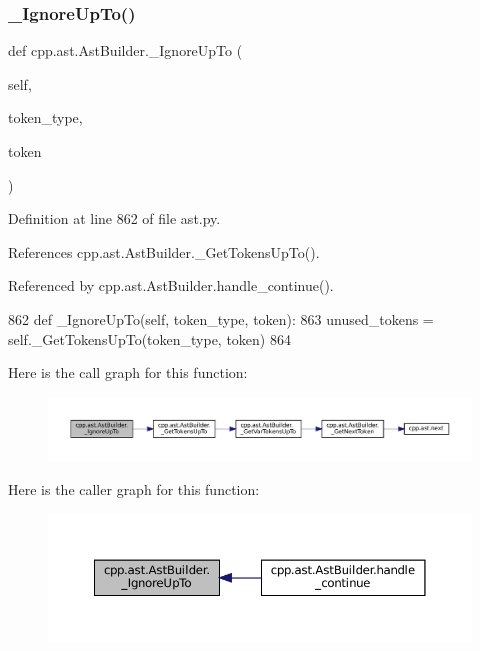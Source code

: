 \subsubsection{\texorpdfstring{\+\_\+\+Ignore\+Up\+To()}{\_IgnoreUpTo()}}
{\footnotesize\ttfamily def cpp.\+ast.\+Ast\+Builder.\+\_\+\+Ignore\+Up\+To (\begin{DoxyParamCaption}\item[{}]{self,  }\item[{}]{token\+\_\+type,  }\item[{}]{token }\end{DoxyParamCaption})\hspace{0.3cm}{\ttfamily [private]}}



Definition at line 862 of file ast.\+py.



References cpp.\+ast.\+Ast\+Builder.\+\_\+\+Get\+Tokens\+Up\+To().



Referenced by cpp.\+ast.\+Ast\+Builder.\+handle\+\_\+continue().


\begin{DoxyCode}
862     \textcolor{keyword}{def }\_IgnoreUpTo(self, token\_type, token):
863         unused\_tokens = self.\_GetTokensUpTo(token\_type, token)
864 
\end{DoxyCode}
Here is the call graph for this function\+:
\nopagebreak
\begin{figure}[H]
\begin{center}
\leavevmode
\includegraphics[width=350pt]{classcpp_1_1ast_1_1AstBuilder_affc78a722f3038f6384147512fa8ef89_cgraph}
\end{center}
\end{figure}
Here is the caller graph for this function\+:
\nopagebreak
\begin{figure}[H]
\begin{center}
\leavevmode
\includegraphics[width=350pt]{classcpp_1_1ast_1_1AstBuilder_affc78a722f3038f6384147512fa8ef89_icgraph}
\end{center}
\end{figure}
\mbox{\label{classcpp_1_1ast_1_1AstBuilder_a2e872094ebb16513f608e1be21c41dd0}} 
